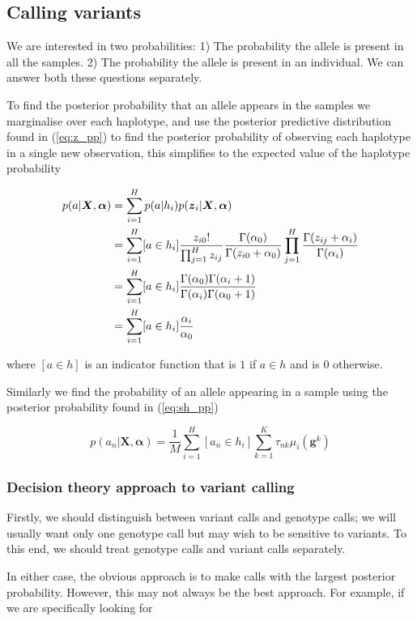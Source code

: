 \documentclass{article}
\begin{document}
\subsection{Calling variants}

We are interested in two probabilities: 1) The probability the allele is present in all the samples. 2) The probability the allele is present in an individual. We can answer both these questions separately.

To find the posterior probability that an allele appears in the samples we marginalise over each haplotype, and use the posterior predictive distribution found in (\ref{eq:z_pp}) to find the posterior probability of observing each haplotype in a single new observation, this simplifies to the expected value of the haplotype probability

\begin{align}
    p(a | \boldsymbol{X}, \boldsymbol{\alpha}) &= \sum_{i = 1}^H p(a | h_i) p(\boldsymbol{z}_i | \boldsymbol{X}, \boldsymbol{\alpha}) \notag \\
    &= \sum_{i = 1}^H [a \in h_i] \frac{z_{i0}!}{\prod_{j = 1}^{H} z_{ij}} \frac{\Gamma(\alpha_0)}{\Gamma(z_{i0} + \alpha_0)} \prod_{j = 1}^H \frac{\Gamma(z_{ij} + \alpha_i)}{\Gamma(\alpha_i)} \notag \\
    &= \sum_{i = 1}^H [a \in h_i] \frac{\Gamma(\alpha_0)\Gamma(\alpha_i + 1)}{\Gamma(\alpha_i)\Gamma(\alpha_0 + 1)} \notag \\
    &= \sum_{i = 1}^H [a \in h_i] \frac{\alpha_i}{\alpha_0}
\end{align}

where $[a \in h]$ is an indicator function that is $1$ if $a \in h$ and is $0$ otherwise.

Similarly we find the probability of an allele appearing in a sample using the posterior probability found in (\ref{eq:sh_pp})

\begin{equation}
\label{eq:sa_pp}
    p(a_n | \boldsymbol{X}, \boldsymbol{\alpha}) = \frac{1}{M} \sum_{i = 1}^H [a_n \in h_i] \sum_{k = 1}^K \tau_{nk}\mu_i(\boldsymbol{g}^k)
\end{equation}

\subsubsection{Decision theory approach to variant calling}

Firstly, we should distinguish between variant calls and genotype calls; we will usually want only one genotype call but may wish to be sensitive to variants. To this end, we should treat genotype calls and variant calls separately.

In either case, the obvious approach is to make calls with the largest posterior probability. However, this may not always be the best approach. For example, if we are specifically looking for 
\end{document}
